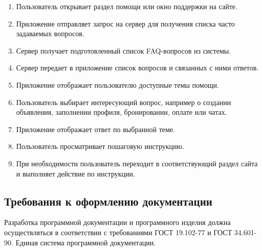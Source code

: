 \begin{enumerate}
    \item Пользователь открывает раздел помощи или окно поддержки на сайте.
    \item Приложение отправляет запрос на сервер для получения списка часто задаваемых вопросов.
    \item Сервер получает подготовленный список FAQ-вопросов из системы.
    \item Сервер передает в приложение список вопросов и связанных с ними ответов.
    \item Приложение отображает пользователю доступные темы помощи.
    \item Пользователь выбирает интересующий вопрос, например о создании объявления, заполнении профиля, бронировании, оплате или чатах.
    \item Приложение отображает ответ по выбранной теме.
    \item Пользователь просматривает пошаговую инструкцию.
    \item При необходимости пользователь переходит в соответствующий раздел сайта и выполняет действие по инструкции.
\end{enumerate}

\subsection{Требования к оформлению документации}

Разработка программной документации и программного изделия должна осуществляться в соответствии с требованиями ГОСТ 19.102-77 и ГОСТ 34.601-90. Единая система программной документации.